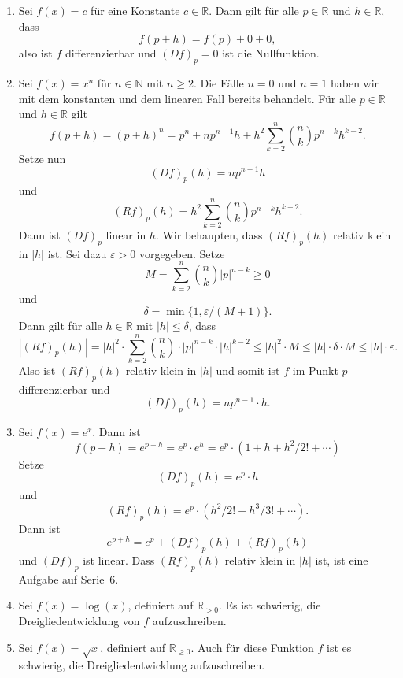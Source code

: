 \documentclass[../main.tex]{subfiles}
\begin{document}
\begin{examples}
  \leavevmode
  \begin{enumerate}[(1)]
    \item Sei $f(x) = c$ für eine
      Konstante $c \in \mathbb{R}$.
      Dann gilt für alle $p \in \mathbb{R}$
      und $h \in \mathbb{R}$, dass
      \[
        f(p + h) = f(p) + 0 + 0,
      \]
      also ist $f$ differenzierbar und
      ${(Df)}_p = 0$ ist die Nullfunktion.
    \item Sei $f(x) = x^n$ für $n \in \mathbb{N}$
      mit $n \geq 2$. Die Fälle $n = 0$ und $n = 1$
      haben wir mit dem konstanten und dem linearen
      Fall bereits behandelt.
      Für alle $p \in \mathbb{R}$ und
      $h \in \mathbb{R}$ gilt
      \[
        f(p + h) = {(p + h)}^n
        = p^n + np^{n-1}h + h^2 \sum_{k=2}^{n} \binom{n}{k}
        p^{n-k}h^{k-2}.
      \]
      Setze nun
      \[
        {(Df)}_p(h) = np^{n-1}h
      \]
      und
      \[
        {(Rf)}_p(h) = h^2 \sum_{k=2}^{n} \binom{n}{k} p^{n-k}h^{k-2}.
      \]
      Dann ist ${(Df)}_p$ linear in $h$.
      Wir behaupten, dass ${(Rf)}_p(h)$ relativ
      klein in $|h|$ ist.
      Sei dazu $\varepsilon > 0$ vorgegeben.
      Setze
      \[
        M = \sum_{k=2}^{n} \binom{n}{k}|p|^{n-k} \geq 0
      \]
      und
      \[
        \delta = \min \{1, \varepsilon / (M + 1)\}.
      \]
      Dann gilt für alle $h \in \mathbb{R}$
      mit $|h| \leq \delta$,
      dass
      \[
        |{(Rf)}_p(h)| = |h|^2 \cdot \sum_{k=2}^{n}
        \binom{n}{k} \cdot |p|^{n-k} \cdot |h|^{k-2}
                 \leq |h|^2 \cdot M %
                 \leq |h| \cdot \delta \cdot M
                 \leq|h| \cdot  \varepsilon.
      \]
      Also ist ${(Rf)}_p(h)$ relativ klein in $|h|$
      und somit ist $f$ im Punkt $p$ differenzierbar und
      \[
        {(Df)}_p(h) = n p^{n-1} \cdot h.
      \]
    \item Sei $f(x) = e^x$. Dann ist
      \[
        f(p + h) = e^{p+h} = e^p \cdot e^h
        = e^p \cdot (1  +h + h^2/2! + \cdots)
      \]
      Setze
      \[
        {(Df)}_p(h) = e^p \cdot h
      \]
      und
      \[
        {(Rf)}_p(h) = e^p \cdot (h^2/2! + h^3/3! + \cdots).
      \]
      Dann ist
      \[
        e^{p+h} = e^p + {(Df)}_p(h) + {(Rf)}_p(h)
      \]
      und ${(Df)}_p$ ist linear.
      Dass ${(Rf)}_p(h)$ relativ klein
      in $|h|$ ist, ist eine Aufgabe auf Serie~6.
    \item Sei $f(x) = \log(x)$, definiert auf
      $\mathbb{R}_{>0}$.
      Es ist schwierig, die Dreigliedentwicklung
      von $f$ aufzuschreiben.
    \item Sei $f(x) = \sqrt x$, definiert auf
      $\mathbb{R}_{\geq 0}$.
      Auch für diese Funktion $f$ ist es schwierig,
      die Dreigliedentwicklung aufzuschreiben.
  \end{enumerate}
\end{examples}
\end{document}
